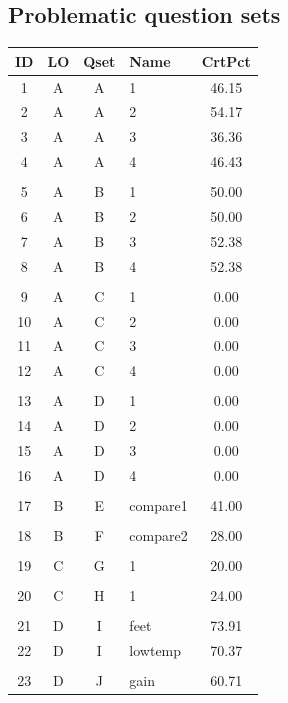 \documentclass[12pt,nohyper]{tufte-handout}\usepackage[]{graphicx}\usepackage[]{color}
\begin{document}
\subsection{Problematic question sets}

\begin{longtable}{ccclc}
  \hline
ID & LO & Qset & Name & CrtPct \\ 
  \hline
  1 & A & A & 1 & 46.15 \\ 
    2 & A & A & 2 & 54.17 \\ 
    3 & A & A & 3 & 36.36 \\ 
    4 & A & A & 4 & 46.43 \\ 
   &  &  &  &  \\ 
    5 & A & B & 1 & 50.00 \\ 
    6 & A & B & 2 & 50.00 \\ 
    7 & A & B & 3 & 52.38 \\ 
    8 & A & B & 4 & 52.38 \\ 
   &  &  &  &  \\ 
    9 & A & C & 1 & 0.00 \\ 
   10 & A & C & 2 & 0.00 \\ 
   11 & A & C & 3 & 0.00 \\ 
   12 & A & C & 4 & 0.00 \\ 
   &  &  &  &  \\ 
   13 & A & D & 1 & 0.00 \\ 
   14 & A & D & 2 & 0.00 \\ 
   15 & A & D & 3 & 0.00 \\ 
   16 & A & D & 4 & 0.00 \\ 
   &  &  &  &  \\ 
   17 & B & E & compare1 & 41.00 \\ 
   &  &  &  &  \\ 
   18 & B & F & compare2 & 28.00 \\ 
   &  &  &  &  \\ 
   19 & C & G & 1 & 20.00 \\ 
   &  &  &  &  \\ 
   20 & C & H & 1 & 24.00 \\ 
   &  &  &  &  \\ 
   21 & D & I & feet & 73.91 \\ 
   22 & D & I & lowtemp & 70.37 \\ 
   &  &  &  &  \\ 
   23 & D & J & gain & 60.71 \\ 

\end{longtable}
\end{document}
